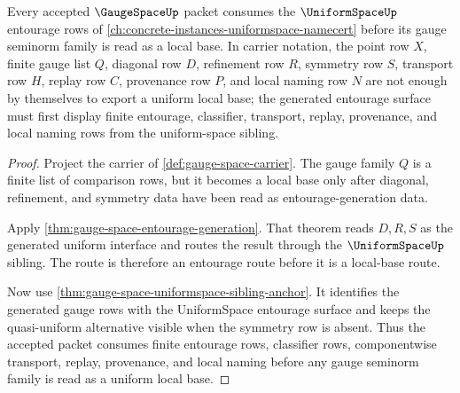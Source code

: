 \begin{theorem}
\label{thm:gauge-space-uniform-space-dependency-route}
Every accepted $\GaugeSpaceUp$ packet consumes the $\UniformSpaceUp$ entourage rows of \autoref{ch:concrete-instances-uniformspace-namecert} before its gauge seminorm family is read as a local base. In carrier notation, the point row $X$, finite gauge list $Q$, diagonal row $D$, refinement row $R$, symmetry row $S$, transport row $H$, replay row $C$, provenance row $P$, and local naming row $N$ are not enough by themselves to export a uniform local base; the generated entourage surface must first display finite entourage, classifier, transport, replay, provenance, and local naming rows from the uniform-space sibling.
\end{theorem}
\begin{proof}
Project the carrier of \autoref{def:gauge-space-carrier}. The gauge family $Q$ is a finite list of comparison rows, but it becomes a local base only after diagonal, refinement, and symmetry data have been read as entourage-generation data.

Apply \autoref{thm:gauge-space-entourage-generation}. That theorem reads $D,R,S$ as the generated uniform interface and routes the result through the $\UniformSpaceUp$ sibling. The route is therefore an entourage route before it is a local-base route.

Now use \autoref{thm:gauge-space-uniformspace-sibling-anchor}. It identifies the generated gauge rows with the UniformSpace entourage surface and keeps the quasi-uniform alternative visible when the symmetry row is absent. Thus the accepted packet consumes finite entourage rows, classifier rows, componentwise transport, replay, provenance, and local naming before any gauge seminorm family is read as a uniform local base.
\end{proof}
